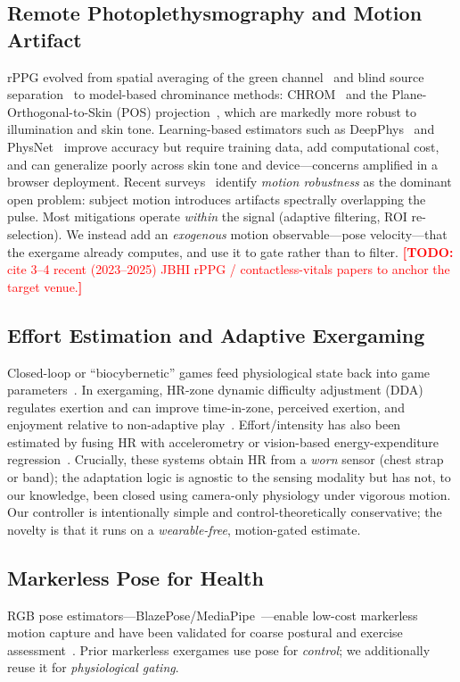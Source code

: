 \documentclass[journal,10pt]{IEEEtran}
\newcommand{\todoNote}[1]{\textcolor{red}{\textbf{[TODO:} #1\textbf{]}}}
\begin{document}
\subsection{Remote Photoplethysmography and Motion Artifact}
rPPG evolved from spatial averaging of the green channel~\cite{verkruysse2008}
and blind source separation~\cite{poh2010} to model-based chrominance methods:
CHROM~\cite{dehaan2013} and the Plane-Orthogonal-to-Skin (POS)
projection~\cite{wang2017}, which are markedly more robust to illumination and
skin tone. Learning-based estimators such as DeepPhys~\cite{chen2018} and
PhysNet~\cite{yu2019} improve accuracy but require training data, add
computational cost, and can generalize poorly across skin tone and
device---concerns amplified in a browser deployment. Recent
surveys~\cite{rppg-survey} identify \emph{motion robustness} as the dominant open
problem: subject motion introduces artifacts spectrally overlapping the pulse.
Most mitigations operate \emph{within} the signal (adaptive filtering, ROI
re-selection). We instead add an \emph{exogenous} motion observable---pose
velocity---that the exergame already computes, and use it to gate rather than to
filter. \todoNote{cite 3--4 recent (2023--2025) JBHI rPPG / contactless-vitals
papers to anchor the target venue.}

\subsection{Effort Estimation and Adaptive Exergaming}
Closed-loop or ``biocybernetic'' games feed physiological state back into game
parameters~\cite{parnandi2013}. In exergaming, HR-zone dynamic difficulty
adjustment (DDA) regulates exertion and can improve time-in-zone, perceived
exertion, and enjoyment relative to non-adaptive
play~\cite{hrdda-vrst,cardio-personalization}. Effort/intensity has also been
estimated by fusing HR with accelerometry or vision-based energy-expenditure
regression~\cite{ee-vision}. Crucially, these systems obtain HR from a
\emph{worn} sensor (chest strap or band); the adaptation logic is agnostic to the
sensing modality but has not, to our knowledge, been closed using camera-only
physiology under vigorous motion. Our controller is intentionally simple and
control-theoretically conservative; the novelty is that it runs on a
\emph{wearable-free}, motion-gated estimate.

\subsection{Markerless Pose for Health}
RGB pose estimators---BlazePose/MediaPipe~\cite{blazepose}---enable low-cost
markerless motion capture and have been validated for coarse postural and
exercise assessment~\cite{mediapipe-validation}. Prior markerless exergames use
pose for \emph{control}; we additionally reuse it for \emph{physiological gating}.
\end{document}
